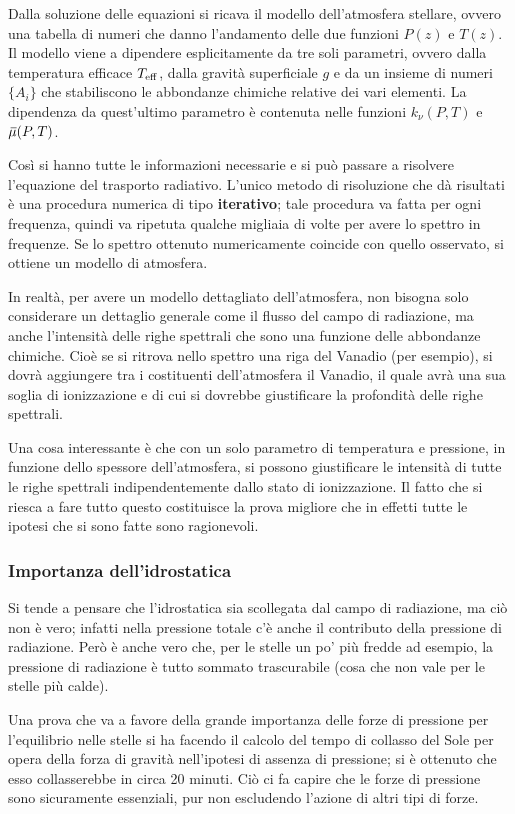Dalla soluzione delle equazioni si ricava il modello dell'atmosfera stellare, ovvero una tabella di numeri che danno l'andamento delle due funzioni $P(z)$ e $T(z)$. Il modello viene a dipendere esplicitamente da tre soli parametri, ovvero dalla temperatura efficace $T_{\rm eff}$, dalla gravità superficiale $g$ e da un insieme di
numeri $\{A_i\}$ che stabiliscono le abbondanze chimiche relative dei vari elementi. La dipendenza da quest'ultimo parametro è contenuta nelle funzioni $k_{\nu}(P, T)$
e ${}\mkern3mu\overline{\mkern-3mu\mu}(P,T)$.

Così si hanno tutte le informazioni necessarie e si può passare a risolvere l'equazione del trasporto radiativo. L'unico metodo di risoluzione che dà risultati è una procedura numerica di tipo \textbf{iterativo}; tale procedura va fatta per ogni frequenza, quindi va ripetuta qualche migliaia di volte per avere lo spettro in frequenze. Se lo spettro ottenuto numericamente coincide con quello osservato, si ottiene un modello di atmosfera.

In realtà, per avere un modello dettagliato dell'atmosfera, non bisogna solo considerare un dettaglio generale come il flusso del campo di radiazione, ma anche l'intensità delle righe spettrali che sono una funzione delle abbondanze chimiche. Cioè se si ritrova nello spettro una riga del Vanadio (per esempio), si dovrà aggiungere tra i costituenti dell'atmosfera il Vanadio, il quale avrà una sua soglia di ionizzazione e di cui si dovrebbe giustificare la profondità delle righe spettrali.

Una cosa interessante è che con un solo parametro di temperatura e pressione, in funzione dello spessore dell'atmosfera, si possono giustificare le intensità di tutte le righe spettrali indipendentemente dallo stato di ionizzazione. Il fatto che si riesca a fare tutto questo costituisce la prova migliore che in effetti tutte le ipotesi che si sono fatte sono ragionevoli.
\subsubsection{Importanza dell'idrostatica}Si tende a pensare che l'idrostatica sia scollegata dal campo di radiazione, ma ciò non è vero; infatti nella pressione totale c'è anche il contributo della pressione di radiazione. Però è anche vero che, per le stelle un po' più fredde ad esempio, la pressione di radiazione è tutto sommato trascurabile (cosa che non vale per le stelle più calde).

Una prova che va a favore della grande importanza delle forze di pressione per l'equilibrio nelle stelle si ha facendo il calcolo del tempo di collasso del Sole per opera della forza di gravità nell'ipotesi di assenza di pressione; si è ottenuto che esso collasserebbe in circa 20 minuti. Ciò ci fa capire che le forze di pressione sono sicuramente essenziali, pur non escludendo l'azione di altri tipi di forze.

